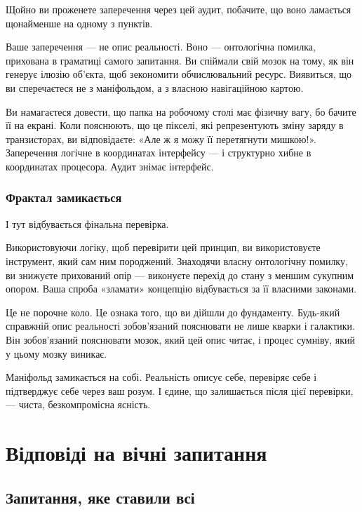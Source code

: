 \documentclass[12pt, a4paper, openany]{book}
\begin{document}
Щойно ви проженете заперечення через цей аудит, побачите, що воно ламається щонайменше на одному з пунктів.

Ваше заперечення — не опис реальності. Воно — онтологічна помилка, прихована в граматиці самого запитання. Ви спіймали свій мозок на тому, як він генерує ілюзію об'єкта, щоб зекономити обчислювальний ресурс. Виявиться, що ви сперечаєтеся не з маніфольдом, а з власною навігаційною картою.

\begin{analogybox}
Ви намагаєтеся довести, що папка на робочому столі має фізичну вагу, бо бачите її на екрані. Коли пояснюють, що це пікселі, які репрезентують зміну заряду в транзисторах, ви відповідаєте: «Але ж я можу її перетягнути мишкою!». Заперечення логічне в координатах інтерфейсу — і структурно хибне в координатах процесора. Аудит знімає інтерфейс.
\end{analogybox}

\section{Фрактал замикається}

І тут відбувається фінальна перевірка.

Використовуючи логіку, щоб перевірити цей принцип, ви використовуєте інструмент, який сам ним породжений. Знаходячи власну онтологічну помилку, ви знижуєте прихований опір — виконуєте перехід до стану з меншим сукупним опором. Ваша спроба «зламати» концепцію відбувається за її власними законами.

Це не порочне коло. Це ознака того, що ви дійшли до фундаменту. Будь-який справжній опис реальності зобов'язаний пояснювати не лише кварки і галактики. Він зобов'язаний пояснювати мозок, який цей опис читає, і процес сумніву, який у цьому мозку виникає.

Маніфольд замикається на собі. Реальність описує себе, перевіряє себе і підтверджує себе через ваш розум. І єдине, що залишається після цієї перевірки, — чиста, безкомпромісна ясність.


\part{Відповіді на вічні запитання}

\chapter{Запитання, яке ставили всі}
\end{document}
